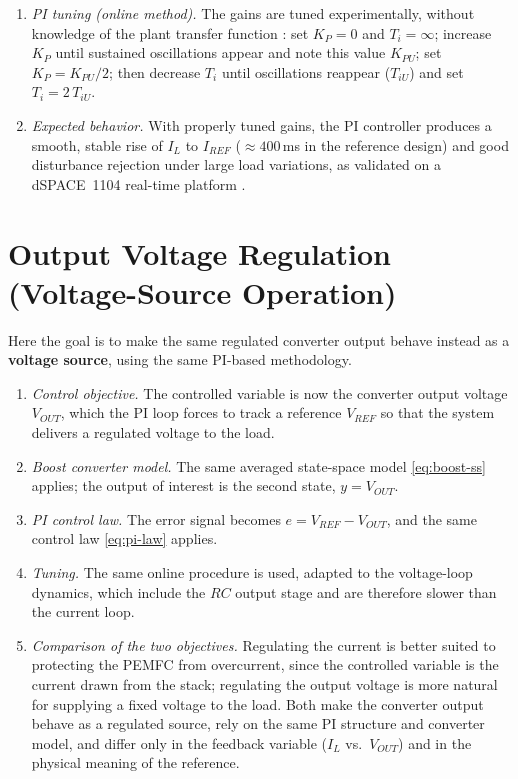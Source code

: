 \begin{enumerate}[label=\arabic*)]
          gains are too aggressive.
    \item \emph{PI tuning (online method).} The gains are tuned experimentally,
          without knowledge of the plant transfer function \cite{derbeli2017}:
          set $K_P=0$ and $T_i=\infty$; increase $K_P$ until sustained
          oscillations appear and note this value $K_{PU}$; set
          $K_P = K_{PU}/2$; then decrease $T_i$ until oscillations reappear
          ($T_{iU}$) and set $T_i = 2\,T_{iU}$.
    \item \emph{Expected behavior.} With properly tuned gains, the PI controller
          produces a smooth, stable rise of $I_L$ to $I_{REF}$ ($\approx 400$\,ms
          in the reference design) and good disturbance rejection under large load
          variations, as validated on a dSPACE~1104 real-time platform
          \cite{derbeli2017}.
\end{enumerate}

\section{Output Voltage Regulation (Voltage-Source Operation)}
\label{sec:control-voltage}

Here the goal is to make the same regulated converter output behave instead as a
\textbf{voltage source}, using the same PI-based methodology.

\begin{enumerate}[label=\arabic*)]
    \item \emph{Control objective.} The controlled variable is now the converter
          output voltage $V_{OUT}$, which the PI loop forces to track a reference
          $V_{REF}$ so that the system delivers a regulated voltage to the load.
    \item \emph{Boost converter model.} The same averaged state-space model
          \eqref{eq:boost-ss} applies; the output of interest is the second
          state, $y = V_{OUT}$.
    \item \emph{PI control law.} The error signal becomes
          $e = V_{REF} - V_{OUT}$, and the same control law \eqref{eq:pi-law}
          applies.
    \item \emph{Tuning.} The same online procedure is used, adapted to the
          voltage-loop dynamics, which include the $RC$ output stage and are
          therefore slower than the current loop.
    \item \emph{Comparison of the two objectives.} Regulating the current is
          better suited to protecting the PEMFC from overcurrent, since the
          controlled variable is the current drawn from the stack; regulating the
          output voltage is more natural for supplying a fixed voltage to the
          load. Both make the converter output behave as a regulated source, rely
          on the same PI structure and converter model, and differ only in the
          feedback variable ($I_L$ vs.\ $V_{OUT}$) and in the physical meaning of
          the reference.
\end{enumerate}

